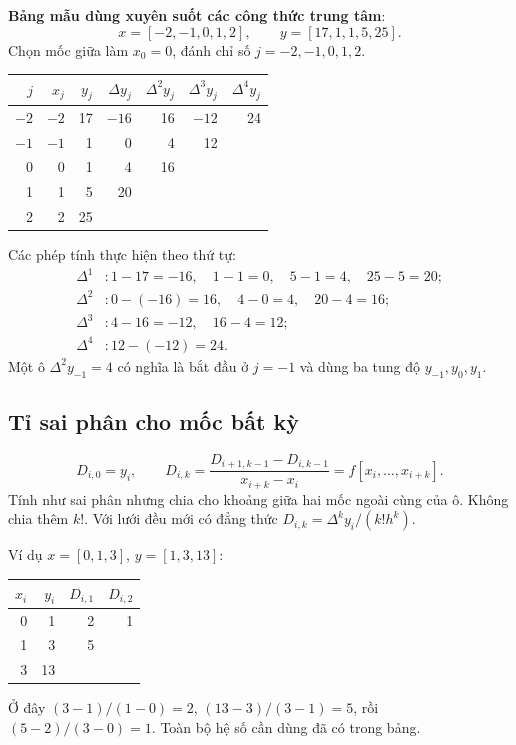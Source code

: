 \textbf{Bảng mẫu dùng xuyên suốt các công thức trung tâm}:
\[
 x=[-2,-1,0,1,2],\qquad y=[17,1,1,5,25].
\]
Chọn mốc giữa làm $x_0=0$, đánh chỉ số $j=-2,-1,0,1,2$.
\begin{center}\small
\begin{tabular}{@{}rrrrrrr@{}}\toprule
$j$ & $x_j$ & $y_j$ & $\Delta y_j$ & $\Delta^2y_j$ & $\Delta^3y_j$ & $\Delta^4y_j$\\\midrule
$-2$ & $-2$ & 17 & $-16$ & 16 & $-12$ & 24\\
$-1$ & $-1$ & 1 & 0 & 4 & 12 & \\
0 & 0 & 1 & 4 & 16 & & \\
1 & 1 & 5 & 20 & & & \\
2 & 2 & 25 & & & & \\\bottomrule
\end{tabular}\end{center}
Các phép tính thực hiện theo thứ tự:
\begin{align*}
\Delta^1 &: 1-17=-16,\quad1-1=0,\quad5-1=4,\quad25-5=20;\\
\Delta^2 &: 0-(-16)=16,\quad4-0=4,\quad20-4=16;\\
\Delta^3 &: 4-16=-12,\quad16-4=12;\\
\Delta^4 &: 12-(-12)=24.
\end{align*}
Một ô $\Delta^2y_{-1}=4$ có nghĩa là bắt đầu ở $j=-1$ và dùng ba tung độ $y_{-1},y_0,y_1$.

\subsection{Tỉ sai phân cho mốc bất kỳ}
\[
 D_{i,0}=y_i,\qquad
 D_{i,k}=\frac{D_{i+1,k-1}-D_{i,k-1}}{x_{i+k}-x_i}
        =f[x_i,\ldots,x_{i+k}].
\]
Tính như sai phân nhưng chia cho khoảng giữa hai mốc ngoài cùng của ô. Không chia thêm $k!$. Với lưới đều mới có đẳng thức $D_{i,k}=\Delta^ky_i/(k!h^k)$.

Ví dụ $x=[0,1,3]$, $y=[1,3,13]$:
\begin{center}\begin{tabular}{@{}rrrr@{}}\toprule
$x_i$ & $y_i$ & $D_{i,1}$ & $D_{i,2}$\\\midrule
0 & 1 & 2 & 1\\
1 & 3 & 5 & \\
3 & 13 & & \\\bottomrule
\end{tabular}\end{center}
Ở đây $(3-1)/(1-0)=2$, $(13-3)/(3-1)=5$, rồi $(5-2)/(3-0)=1$. Toàn bộ hệ số cần dùng đã có trong bảng.

